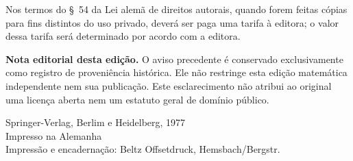 Nos termos do \S~54 da Lei alemã de direitos autorais, quando forem feitas
cópias para fins distintos do uso privado, deverá ser paga uma tarifa à
editora; o valor dessa tarifa será determinado por acordo com a editora.

\medskip
\noindent\textbf{Nota editorial desta edição.}
O aviso precedente é conservado exclusivamente como registro de proveniência
histórica. Ele não restringe esta edição matemática independente nem sua
publicação. Este esclarecimento não atribui ao original uma licença aberta
nem um estatuto geral de domínio público.

\medskip
\begin{flushleft}
\textcopyright{} Springer-Verlag, Berlim e Heidelberg, 1977\\
Impresso na Alemanha\\
Impressão e encadernação: Beltz Offsetdruck,
Hemsbach/Bergstr.
\end{flushleft}
